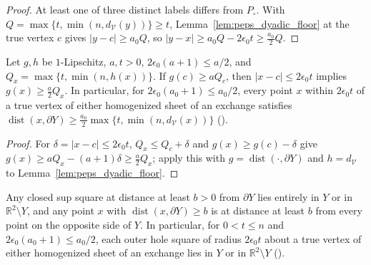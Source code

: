 \begin{proof}\leanok
    At least one of three distinct labels differs from $P_\circ$. With
    $Q=\max\{t,\min(n,d_{\mathcal V}(y))\}\ge t$, Lemma~\ref{lem:peps_dyadic_floor}
    at the true vertex $c$ gives $|y-c|\ge a_0Q$, so
    $|y-x|\ge a_0Q-2\epsilon_0t\ge\tfrac{a_0}2Q$.
\end{proof}

\begin{lemma}
    \label{lem:peps_dyadic_hole_enlargement}
    \leanok
    Let $g,h$ be $1$-Lipschitz, $a,t>0$, $2\epsilon_0(a+1)\le a/2$, and
    $Q_x=\max\{t,\min(n,h(x))\}$. If $g(c)\ge aQ_c$, then $|x-c|\le2\epsilon_0t$
    implies $g(x)\ge\tfrac a2Q_x$. In particular, for $2\epsilon_0(a_0+1)\le a_0/2$,
    every point $x$ within $2\epsilon_0t$ of a true vertex of either homogenized
    sheet of an exchange satisfies
    $\operatorname{dist}(x,\partial Y)\ge\tfrac{a_0}2\max\{t,\min(n,d_{\mathcal V}(x))\}$
    (\cite[Section~7, lines 400--415]{OpenAI2026PolynomialPEPS}).
\end{lemma}

\begin{proof}\leanok
    For $\delta=|x-c|\le2\epsilon_0t$, $Q_x\le Q_c+\delta$ and $g(x)\ge g(c)-\delta$
    give $g(x)\ge aQ_x-(a+1)\delta\ge\tfrac a2Q_x$; apply this with
    $g=\operatorname{dist}(\cdot,\partial Y)$ and $h=d_{\mathcal V}$ to
    Lemma~\ref{lem:peps_dyadic_floor}.
\end{proof}

\begin{lemma}
    \label{lem:peps_dyadic_lens_sides}
    \leanok
    Any closed sup square at distance at least $b>0$ from $\partial Y$ lies entirely
    in $Y$ or in $\mathbb R^2\setminus Y$, and any point $x$ with
    $\operatorname{dist}(x,\partial Y)\ge b$ is at distance at least $b$ from every
    point on the opposite side of $Y$. In particular, for $0<t\le n$ and
    $2\epsilon_0(a_0+1)\le a_0/2$, each outer hole square of radius $2\epsilon_0t$
    about a true vertex of either homogenized sheet of an exchange lies in $Y$ or
    in $\mathbb R^2\setminus Y$ (\cite[Section~7, lines 403--405, 421--429]{OpenAI2026PolynomialPEPS}).
\end{lemma}

